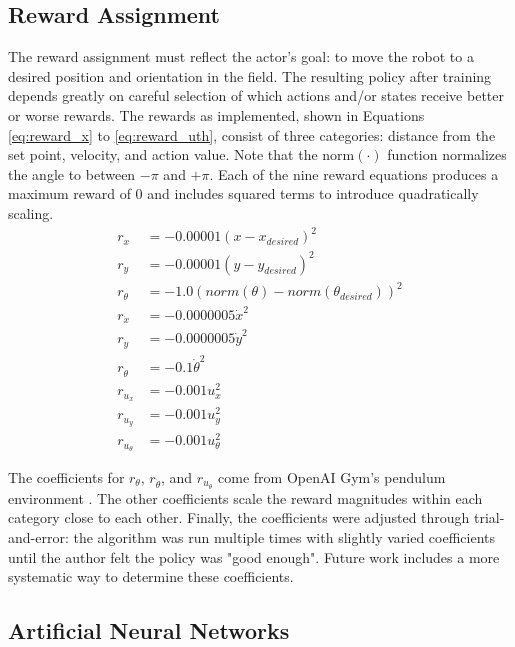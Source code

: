 \subsection{Reward Assignment}
The reward assignment must reflect the actor's goal: to move the robot to a desired position and orientation in the field. The resulting policy after training depends greatly on careful selection of which actions and/or states receive better or worse rewards. The rewards as implemented, shown in Equations \ref{eq:reward_x} to \ref{eq:reward_uth}, consist of three categories: distance from the set point, velocity, and action value. Note that the $\text{norm}(\cdot)$ function normalizes the angle to between $-\pi$ and $+\pi$. Each of the nine reward equations produces a maximum reward of 0 and includes squared terms to introduce quadratically scaling.
\begin{align}
r_x &= -0.00001 (x-x_{desired})^2 \label{eq:reward_x}\\
r_y &= -0.00001 (y-y_{desired})^2 \\
r_\theta &= -1.0 (norm(\theta)-norm(\theta_{desired}))^2 \\
r_{\dot{x}} &= -0.0000005 \dot{x}^2 \\
r_{\dot{y}} &= -0.0000005 \dot{y}^2 \\
r_{\dot{\theta}} &= -0.1 \dot{\theta}^2 \\
r_{u_x} &= -0.001u_x^2 \\
r_{u_y} &= -0.001u_y^2 \\
r_{u_\theta} &= -0.001u_\theta^2 \label{eq:reward_uth}
\end{align}

The coefficients for $r_\theta$, $r_{\dot{\theta}}$, and $r_{u_\theta}$ come from OpenAI Gym's pendulum environment \cite{openai_pendulum}. The other coefficients scale the reward magnitudes within each category close to each other. Finally, the coefficients were adjusted through trial-and-error: the algorithm was run multiple times with slightly varied coefficients until the author felt the policy was "good enough". Future work includes a more systematic way to determine these coefficients.

\subsection{Artificial Neural Networks}
